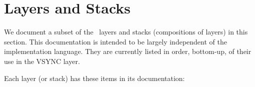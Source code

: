 \newenvironment{Testing}{%
\paragraph{Testing} ~\par\begin{itemize}
}{\end{itemize}}

\section{Layers and Stacks}

We document a subset of the \ensemble\ layers and stacks (compositions of
layers) in this section.  This documentation is intended to be largely
independent of the implementation language.  They are currently listed in
order, bottom-up, of their use in the VSYNC layer.

Each layer (or stack) has these items in its documentation:

